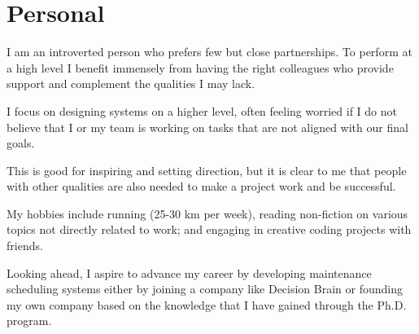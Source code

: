 \section*{Personal}

I am an introverted person who prefers few but close partnerships. To perform at a high level
I benefit immensely from having the right colleagues who provide support and complement the 
qualities I may lack.

I focus on designing systems on a higher level, often feeling worried if I 
do not believe that I or my team is working on tasks that are not aligned with our final goals.

This is good for inspiring and setting direction, but it is clear to me that people with other 
qualities are also needed to make a project work and be successful.

My hobbies include running (25-30 km per week), reading non-fiction on various topics not directly related to work; 
and engaging in creative coding projects with friends.

Looking ahead, I aspire to advance my career by developing maintenance scheduling systems
either by joining a company like Decision Brain or founding my own company based on the
knowledge that I have gained through the Ph.D. program.
